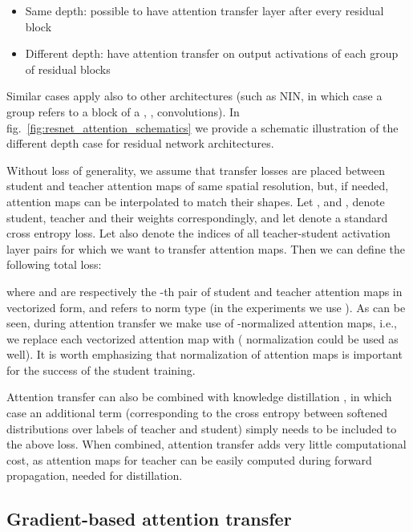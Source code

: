 \documentclass{article} \usepackage{iclr2017_conference}
\begin{document}
\begin{itemize}
  \item Same depth: possible to have attention transfer layer after every residual block  \item Different depth: have attention transfer on output activations of each group of residual blocks \end{itemize}

Similar cases apply also to other architectures (such as NIN, in which case a group refers to a block of a , ,  convolutions).
In fig.~\ref{fig:resnet_attention_schematics} we provide a schematic illustration of  the different depth case for residual network architectures. 

Without loss of generality, we assume that transfer losses are placed between student and teacher attention maps of  same spatial resolution, but, if needed, 
 attention maps can be interpolated to match their shapes.  Let ,  and ,  denote student, teacher and their weights correspondingly, and let  denote a standard cross entropy loss. Let also  denote the indices of all teacher-student activation layer pairs for which we want to transfer attention maps. Then  we can define the following total loss:

 \vspace{-0.4cm}


where  and  are respectively the -th pair of student and teacher attention maps in vectorized form, and  refers to norm type (in the experiments we use ).  As can be seen, during attention transfer we make use of -normalized attention maps, i.e., we replace each vectorized attention map  with  ( normalization could be used as well). It is worth emphasizing  that normalization  of attention maps is important for the success of the student  training.

Attention transfer can also be  combined with knowledge distillation \cite{KD}, in which case an additional term (corresponding to the cross entropy between  softened distributions  over labels of teacher and student)  simply needs to be included to the above loss.
 When combined, attention transfer adds very little computational cost, as attention maps for teacher can be easily computed during forward propagation, needed for distillation.


\subsection{Gradient-based attention transfer}
\end{document}
